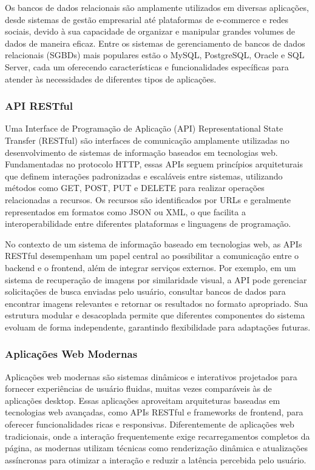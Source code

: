 Os bancos de dados relacionais são amplamente utilizados em diversas aplicações, desde sistemas de gestão empresarial até plataformas de e-commerce e redes sociais, devido à sua capacidade de organizar e manipular grandes volumes de dados de maneira eficaz. Entre os sistemas de gerenciamento de bancos de dados relacionais (SGBDs) mais populares estão o MySQL, PostgreSQL, Oracle e SQL Server, cada um oferecendo características e funcionalidades específicas para atender às necessidades de diferentes tipos de aplicações.


\subsubsection{API RESTful}
Uma Interface de Programação de Aplicação (API) Representational State Transfer (RESTful) são interfaces de comunicação amplamente utilizadas no desenvolvimento de sistemas de informação baseados em tecnologias web. Fundamentadas no protocolo HTTP, essas APIs seguem princípios arquiteturais que definem interações padronizadas e escaláveis entre sistemas, utilizando métodos como GET, POST, PUT e DELETE para realizar operações relacionadas a recursos. Os recursos são identificados por URLs e geralmente representados em formatos como JSON ou XML, o que facilita a interoperabilidade entre diferentes plataformas e linguagens de programação.

No contexto de um sistema de informação baseado em tecnologias web, as APIs RESTful desempenham um papel central ao possibilitar a comunicação entre o backend e o frontend, além de integrar serviços externos. Por exemplo, em um sistema de recuperação de imagens por similaridade visual, a API pode gerenciar solicitações de busca enviadas pelo usuário, consultar bancos de dados para encontrar imagens relevantes e retornar os resultados no formato apropriado. Sua estrutura modular e desacoplada permite que diferentes componentes do sistema evoluam de forma independente, garantindo flexibilidade para adaptações futuras.


\subsubsection{Aplicações Web Modernas}

Aplicações web modernas são sistemas dinâmicos e interativos projetados para fornecer experiências de usuário fluidas, muitas vezes comparáveis às de aplicações desktop. Essas aplicações aproveitam arquiteturas baseadas em tecnologias web avançadas, como APIs RESTful e frameworks de frontend, para oferecer funcionalidades ricas e responsivas. Diferentemente de aplicações web tradicionais, onde a interação frequentemente exige recarregamentos completos da página, as modernas utilizam técnicas como renderização dinâmica e atualizações assíncronas para otimizar a interação e reduzir a latência percebida pelo usuário.

